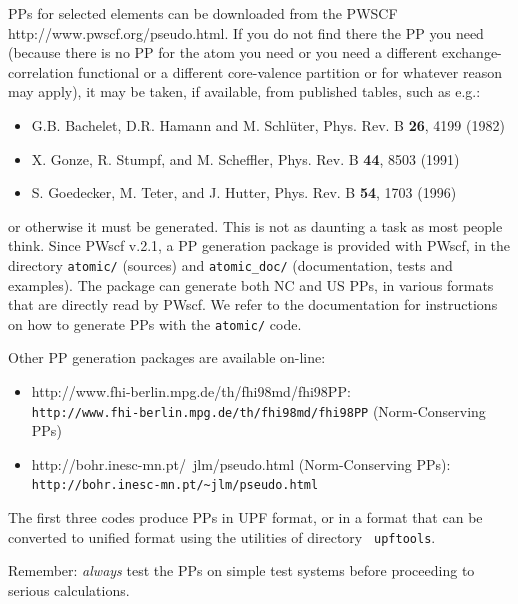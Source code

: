 \documentclass[12pt]{article}
\begin{document}
PPs for selected elements can be downloaded from the PWSCF 
{http://www.pwscf.org/pseudo.html}.
If you do not find there the PP you need (because there is no PP for the
atom you need or you need a different exchange-correlation functional or
a different core-valence partition or for whatever reason may apply), it
may be taken, if available, from published tables, such as e.g.:
\begin{itemize}
\item 
G.B. Bachelet, D.R. Hamann and M. Schl\"uter, Phys. Rev. B {\bf 26},
4199 (1982)
\item
X. Gonze, R. Stumpf, and M. Scheffler, Phys. Rev. B {\bf 44}, 8503 (1991)
\item
S. Goedecker, M. Teter, and J. Hutter, Phys. Rev. B {\bf 54}, 1703 (1996)
\end{itemize}
or otherwise it must be generated. This is not as daunting a task as 
most people think.
Since PWscf v.2.1, a PP generation package is provided with
PWscf, in the directory {\tt atomic/} (sources) and 
{\tt atomic\_doc/} (documentation, tests and examples). 
The package can generate both NC and US PPs, in various formats
that are directly read by PWscf. We refer to the documentation
for instructions on how to generate PPs with the {\tt atomic/}
code.

Other PP generation packages are available on-line:
\begin{itemize}
{http://www.physics.rutgers.edu/~dhv/uspp/index.html} (UltraSoft PPs):\\
{\tt http://www.physics.rutgers.edu/\~{}dhv/uspp/index.html}
\item
{}
{http://www.fhi-berlin.mpg.de/th/fhi98md/fhi98PP}:\\
{\tt http://www.fhi-berlin.mpg.de/th/fhi98md/fhi98PP}
(Norm-Conserving PPs)
\item
{}
{http://bohr.inesc-mn.pt/~jlm/pseudo.html} (Norm-Conserving PPs):\\
{\tt http://bohr.inesc-mn.pt/\~{}jlm/pseudo.html}
\end{itemize}
The first three codes produce PPs in UPF format, or in a format that can
be converted to unified format using the utilities of directory {\tt
upftools}.

Remember: {\em always} test the PPs on simple test systems before
proceeding to serious calculations.
\end{document}
